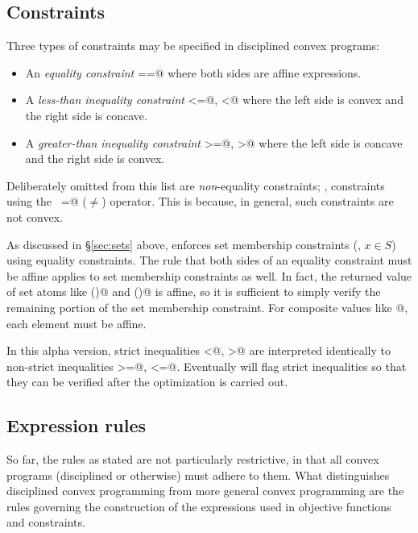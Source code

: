 \documentclass[12pt]{article}
\begin{document}
\subsection{Constraints}

Three types of constraints may be specified in disciplined convex programs:
\begin{itemize}
\item An \emph{equality constraint} \verb@==@ where both sides are affine expressions.
\item A \emph{less-than inequality constraint} \verb@<=@, \verb@<@ 
where the left side is convex and the right side is concave.
\item A \emph{greater-than inequality constraint} \verb@>=@, \verb@>@ 
where the left side is concave and the right side is convex.
\end{itemize}
Deliberately omitted from this list are \emph{non}-equality constraints; \ie,
constraints using the \verb@~=@ ($\neq$) operator. This is because, in general,
such constraints are not convex.

As discussed in \S\ref{sec:sets} above, \cvx enforces set 
membership constraints (\eg, $x\in S$) using
equality constraints. 
The rule that both sides of an equality constraint
must be affine applies to set membership constraints as well. 
In fact, the returned value of set atoms like 
\verb@semidefinite()@ and \verb@lorentz()@ is affine,
so it is sufficient to simply verify the remaining portion
of the set membership constraint. For composite values like
@, each element must be affine.

In this alpha version, 
strict inequalities \verb@<@, \verb@>@ are interpreted
identically to non-strict inequalities \verb@>=@, \verb@<=@. 
Eventually \cvx will flag strict inequalities so that they 
can be verified after the optimization is carried out.

\subsection{Expression rules}
\label{sec:noproduct}

So far, the rules as stated are not particularly restrictive, 
in that all convex programs (disciplined or otherwise) 
must adhere to them.
What distinguishes disciplined convex programming from more general
convex programming are the rules governing
the construction of the expressions used in objective functions and
constraints.
\end{document}
